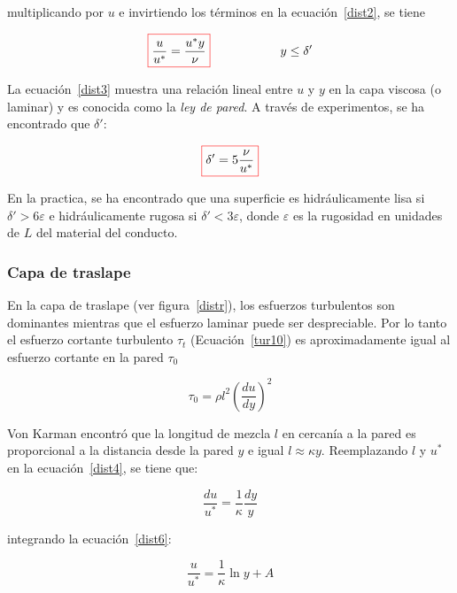 \documentclass[11pt, oneside]{article}
\begin{document}
multiplicando por $u$ e invirtiendo los t\'erminos en la ecuaci\'on~\ref{dist2}, se tiene

\begin{equation}
\color{red}\boxed{\color{black} \frac{u}{u^*} = \frac{u^* y}{\nu} } \hspace{2cm} \color{black} y \leq \delta' 
\label{dist3}
\end{equation}

La ecuaci\'on~\ref{dist3} muestra una relaci\'on lineal entre $u$ y $y$ en la capa viscosa (o laminar) y es conocida como la \emph{ley de pared}. A trav\'es de experimentos, se ha encontrado que $\delta '$:

\begin{equation}
\color{red}\boxed{\color{black} \delta ' = 5 \frac{\nu}{u^* } }
\label{dist4}
\end{equation}

En la practica, se ha encontrado que una superficie es hidr\'aulicamente lisa si $\delta ' > 6 \varepsilon$ e hidr\'aulicamente rugosa si $\delta ' < 3 \varepsilon$, donde $\varepsilon$ es la rugosidad en unidades de $L$ del material del conducto.

\subsubsection*{Capa de traslape} %
En la capa de traslape (ver figura~\ref{distr}),  los esfuerzos turbulentos son dominantes mientras que el esfuerzo laminar puede ser despreciable. Por lo tanto el esfuerzo cortante turbulento  $\tau_t$ (Ecuaci\'on~\ref{tur10}) es aproximadamente igual al esfuerzo cortante en la pared $\tau_0$

\begin{equation}
\tau_0 = \rho l^2 \left( \frac{du}{dy} \right)^2
\label{dist5}
\end{equation}

Von Karman encontr\'o que la longitud de mezcla $l$ en cercan\'ia a la pared es proporcional a la distancia desde la pared $y$ e igual $l \approx \kappa y$. Reemplazando $l$  y $u^*$ en la ecuaci\'on~\ref{dist4}, se tiene que:

\begin{equation}
\frac{du}{u^*} = \frac{1}{\kappa} \frac{dy}{y}
\label{dist6}
\end{equation}

integrando la ecuaci\'on~\ref{dist6}:

\begin{equation}
\frac{u}{u^*} = \frac{1}{\kappa} \ln y + A
\label{dist7}
\end{equation}
\end{document}
